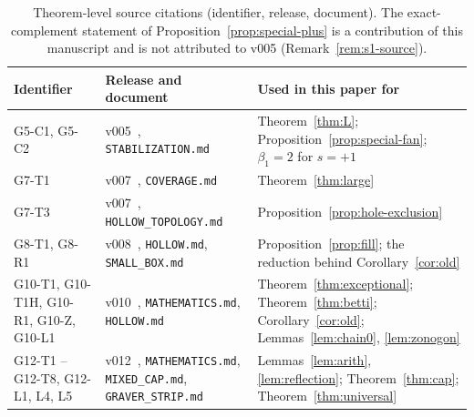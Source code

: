 \begin{table}[ht]
\centering\small
\begin{tabular}{@{}p{3.3cm}p{5.4cm}p{5.8cm}@{}}
\toprule Identifier & Release and document & Used in this paper for\\\midrule
G5-C1, G5-C2 & v005~\cite{GEOIv005}, \texttt{STABILIZATION.md} & Theorem~\ref{thm:L}; Proposition~\ref{prop:special-fan}; $\beta_1=2$ for $s=+1$\\
G7-T1 & v007~\cite{GEOIv007}, \texttt{COVERAGE.md} & Theorem~\ref{thm:large}\\
G7-T3 & v007~\cite{GEOIv007}, \texttt{HOLLOW\_TOPOLOGY.md} & Proposition~\ref{prop:hole-exclusion}\\
G8-T1, G8-R1 & v008~\cite{GEOIv008}, \texttt{HOLLOW.md}, \texttt{SMALL\_BOX.md} & Proposition~\ref{prop:fill}; the reduction behind Corollary~\ref{cor:old}\\
G10-T1, G10-T1H, G10-R1, G10-Z, G10-L1 & v010~\cite{GEOIv010}, \texttt{MATHEMATICS.md}, \texttt{HOLLOW.md} & Theorem~\ref{thm:exceptional}; Theorem~\ref{thm:betti}; Corollary~\ref{cor:old}; Lemmas~\ref{lem:chain0}, \ref{lem:zonogon}\\
G12-T1 -- G12-T8, G12-L1, L4, L5 & v012~\cite{GEOIv012}, \texttt{MATHEMATICS.md}, \texttt{MIXED\_CAP.md}, \texttt{GRAVER\_STRIP.md} & Lemmas~\ref{lem:arith}, \ref{lem:reflection}; Theorem~\ref{thm:cap}; Theorem~\ref{thm:universal}\\
\bottomrule
\end{tabular}
\caption{Theorem-level source citations (identifier, release, document). The exact-complement statement of Proposition~\ref{prop:special-plus} is a contribution of this manuscript and is not attributed to v005 (Remark~\ref{rem:s1-source}).}\label{tab:geoi-theorems}
\end{table}
